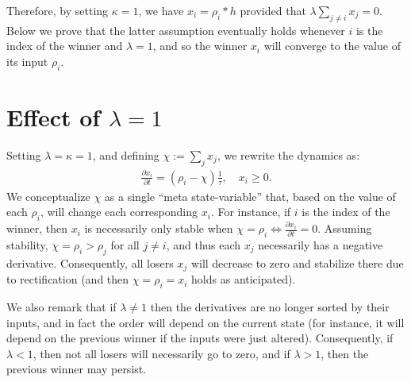 Therefore, by setting $\kappa = 1$, we have $x_i = \rho_i \ast h$ provided that $\lambda \sum_{j \ne i} x_j = 0$.
Below we prove that the latter assumption eventually holds whenever $i$ is the index of the winner and $\lambda = 1$, and so the winner $x_i$ will converge to the value of its input $\rho_i$.


\section{Effect of \texorpdfstring{$\lambda = 1$}{λ=1}}

Setting $\lambda = \kappa = 1$, and defining $\chi := \sum_j x_j$, we rewrite the dynamics as:
\begin{equation} \label{eq:um-special}
    \begin{split}
        \frac{{\partial x}_i}{\partial t} = \left(\rho_i - \chi \right) \frac{1}{\tau}, \quad x_i \ge 0.
    \end{split}
\end{equation}
We conceptualize $\chi$ as a single ``meta state-variable'' that, based on the value of each $\rho_i$, will change each corresponding $x_i$.
For instance, if $i$ is the index of the winner, then $x_i$ is necessarily only stable when $\chi = \rho_i \iff \frac{{\partial x}_i}{\partial t} = 0$.
Assuming stability, $\chi = \rho_i > \rho_j$ for all $j \ne i$, and thus each $x_j$ necessarily has a negative derivative.
Consequently, all losers $x_j$ will decrease to zero and stabilize there due to rectification (and then $\chi = \rho_i = x_i$ holds as anticipated).

We also remark that if $\lambda \ne 1$ then the derivatives are no longer sorted by their inputs, and in fact the order will depend on the current state (for instance, it will depend on the previous winner if the inputs were just altered). Consequently, if $\lambda < 1$, then not all losers will necessarily go to zero, and if $\lambda > 1$, then the previous winner may persist.
